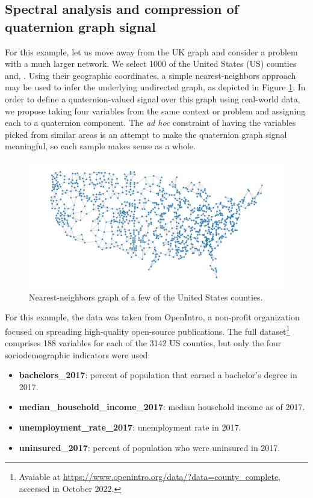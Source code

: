 \subsection{Spectral analysis and compression of quaternion graph signal}

For this example, let us move away from the UK graph and consider a problem with a much larger network. We select 1000 of the United States (US) counties and, . Using their geographic coordinates, a simple nearest-neighbors approach may be used to infer the underlying undirected graph, as depicted in Figure \ref{fig:us_graph}. In order to define a quaternion-valued signal over this graph using real-world data, we propose taking four variables from the same context or problem and assigning each to a quaternion component. The \textit{ad hoc} constraint of having the variables picked from similar areas is an attempt to make the quaternion graph signal meaningful, so each sample makes sense as a whole.

\begin{figure}
\centering
\includegraphics[width=0.8\linewidth]{thesis/Figures/us_graph.pdf}
\caption{Nearest-neighbors graph of a few of the United States counties.}
\label{fig:us_graph}
\end{figure}

For this example, the data was taken from OpenIntro, a non-profit organization focused on spreading high-quality open-source publications. The full dataset\footnote{Avaiable at \url{https://www.openintro.org/data/?data=county_complete}, accessed in October 2022.} comprises 188 variables for each of the 3142 US counties, but only the four sociodemographic indicators were used:
\begin{itemize}[noitemsep]
    \item \textbf{bachelors\_2017}: percent of population that earned a bachelor's degree in 2017.
    \item \textbf{median\_household\_income\_2017}: median household income as of 2017.
    \item \textbf{unemployment\_rate\_2017}: unemployment rate in 2017.
    \item \textbf{uninsured\_2017}: percent of population who were uninsured in 2017.
\end{itemize}

